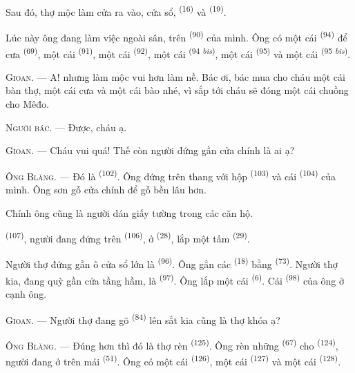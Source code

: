 Sau đó, thợ mộc làm cửa ra vào, cửa sổ,  \textsuperscript{(16)} và
 \textsuperscript{(19)}.

Lúc này ông đang làm việc ngoài sân, trên  \textsuperscript{(90)} của
mình. Ông có một cái  \textsuperscript{(94)} để cưa 
\textsuperscript{(69)}, một cái  \textsuperscript{(91)}, một cái  \textsuperscript{(92)}, một cái  \textsuperscript{(94 \textit{bis})},
một cái  \textsuperscript{(95)} và một cái 
\textsuperscript{(95 \textit{bis})}.

\textsc{Gioan}. --- A! nhưng làm mộc vui hơn làm nề. Bác ơi, bác mua cho cháu một cái
bàn thợ, một cái cưa và một cái bào nhé, vì sắp tới cháu sẽ đóng một cái chuồng cho
Mêđo.

\textsc{Người bác}. --- Được, cháu ạ.

\textsc{Gioan}. --- Cháu vui quá! Thế còn người đứng gần cửa chính là ai ạ?

\VUsaut{3.0mm}
\VUsaut{3.0mm}

\textsc{Ông Blăng}. --- Đó là  \textsuperscript{(102)}. Ông đứng trên
thang với hộp  \textsuperscript{(103)} và cái 
\textsuperscript{(104)} của mình. Ông sơn gỗ cửa chính để gỗ bền lâu hơn.

Chính ông cũng là người dán giấy tường trong các căn hộ.

 \textsuperscript{(107)}, người đang đứng trên 
\textsuperscript{(106)}, ở  \textsuperscript{(28)}, lắp một tấm
 \textsuperscript{(29)}.

Người thợ đứng gần ô cửa sổ lớn là  \textsuperscript{(96)}. Ông gắn các
 \textsuperscript{(18)} bằng  \textsuperscript{(73)}.
Người thợ kia, đang quỳ gần cửa tầng hầm, là 
\textsuperscript{(97)}. Ông lắp một cái  \textsuperscript{(6)}. Cái
 \textsuperscript{(98)} của ông ở cạnh ông.

\textsc{Gioan}. --- Người thợ đang gõ  \textsuperscript{(84)} lên sắt kia
cũng là thợ khóa ạ?

\textsc{Ông Blăng}. --- Đúng hơn thì đó là thợ rèn \textsuperscript{(125)}. Ông rèn
những  \textsuperscript{(67)} cho 
\textsuperscript{(124)}, người đang ở trên mái  \textsuperscript{(51)}.
Ông có một cái  \textsuperscript{(126)}, một cái 
\textsuperscript{(127)} và một cái  \textsuperscript{(128)}.


